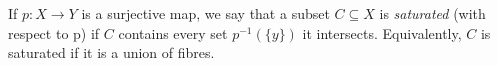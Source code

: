 \documentclass[12pt]{article}
\begin{document}
If $p: X \longrightarrow Y$ is a surjective map, we say that a subset $C \subseteq X$ is {\em saturated} (with respect to p) if $C$ contains every set $p^{-1}(\{y\})$ it intersects. Equivalently, $C$ is saturated if it is a union of fibres.
\end{document}
